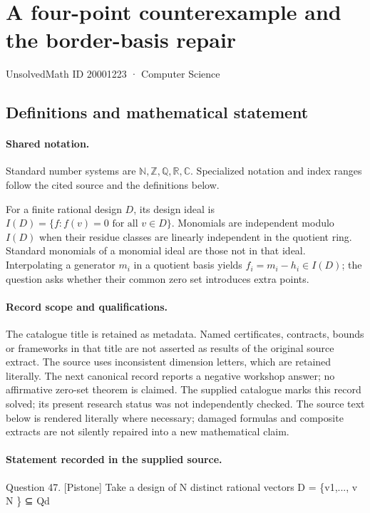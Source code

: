 \documentclass[11pt]{article}
\begin{document}
\setcounter{section}{20001222}
\section{A four-point counterexample and the border-basis repair}\label{20001223}
{\small\sffamily UnsolvedMath ID 20001223 · Computer Science}
\subsection{Definitions and mathematical statement}

\paragraph{Shared notation.}Standard number systems are $\mathbb N,\mathbb Z,\mathbb Q,\mathbb R,\mathbb C$. Specialized notation and index ranges follow the cited source and the definitions below.


For a finite rational design $D$, its design ideal is $I(D)=\{f:f(v)=0\text{ for all }v\in D\}$. Monomials are independent modulo $I(D)$ when their residue classes are linearly independent in the quotient ring. Standard monomials of a monomial ideal are those not in that ideal. Interpolating a generator $m_i$ in a quotient basis yields $f_i=m_i-h_i\in I(D)$; the question asks whether their common zero set introduces extra points.
\paragraph{Record scope and qualifications.}
The catalogue title is retained as metadata. Named certificates, contracts, bounds or frameworks in that title are not asserted as results of the original source extract.
The source uses inconsistent dimension letters, which are retained literally. The next canonical record reports a negative workshop answer; no affirmative zero-set theorem is claimed. The supplied catalogue marks this record solved; its present research status was not independently checked.
The source text below is rendered literally where necessary; damaged formulas and composite extracts are not silently repaired into a new mathematical claim.
\paragraph{Statement recorded in the supplied source.}
Question 47. [Pistone] Take a design of N distinct rational vectors D = \{v1,..., v N \} ⊆ Qd
\end{document}
